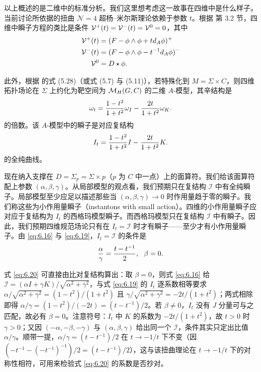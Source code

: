 以上概述的是二维中的标准分析。我们这里想考虑这一故事在四维中是什么样子。当前讨论所依据的扭曲 ${\mathcal N}=4$ 超杨–米尔斯理论依赖于参数 $t$。根据 \cite{ref8} 第 3.2 节，四维中瞬子方程的类比是条件 $\mathcal{V}^+(t)=\mathcal{V}^-(t)=\mathcal{V}^0=0$，其中
\setcounter{equation}{16}
\begin{equation}\label{eq:6.17}
  \begin{aligned}\mathcal{V}^+(t)&=(F-\phi\wedge\phi+td_A\phi)^+\\
                   \mathcal{V}^-(t)&=(F-\phi\wedge\phi-t^{-1}d_A\phi)^-\\
                    \mathcal{V}^0&=D\star \phi.\end{aligned}
\end{equation}

此外，根据 \cite{ref8} 的式 (5.28)（或式 (5.7) 与 (5.11)），若特殊化到 $M=\Sigma\times C$，则四维拓扑场论在 $\Sigma$ 上约化为靶空间为 ${{\mathcal{M}}_H}(G,C)$ 的二维 $A$-模型，其辛结构是
\setcounter{equation}{17}
\begin{equation}\label{eq:6.18}
  \omega_t={1-t^2\over
1+t^2}\omega_I-{2t\over 1+t^2}\omega_K.
\end{equation}
 的倍数。该 $A$-模型中的瞬子是对应复结构
\setcounter{equation}{18}
\begin{equation}\label{eq:6.19}
  I_t={1-t^2\over 1+t^2}I-{2t\over 1+t^2}K.
\end{equation}
 的全纯曲线。

现在纳入支撑在 $D=\Sigma_p=\Sigma\times p$（$p$ 为 $C$ 中一点）上的面算符。我们给该面算符配上参数 $(\alpha,\beta,\gamma)$。从局部模型的观点看，我们预期只在复结构 $\mathcal I$ 中有全纯瞬子。局部模型至少应足以描述那些当 $(\alpha,\beta,\gamma)\to 0$ 时作用量趋于零的瞬子。我们称这些为小作用量瞬子（instantons with small action）。四维的小作用量瞬子应对应于复结构为 $I_t$ 的西格玛模型瞬子。而西格玛模型只在复结构 $\mathcal I$ 中有瞬子。因此，我们预期四维规范场论只有在 $I_t=\mathcal I$ 时才有瞬子——至少才有小作用量瞬子。由 \eqref{eq:6.16} 与 \eqref{eq:6.19}，$I_t=\mathcal I$ 的条件是
\setcounter{equation}{19}
\begin{equation}\label{eq:6.20}
  {\alpha\over\gamma}={t-t^{-1}\over 2},~~\beta=0.
\end{equation}

\begin{yizhu}[含糊点拨]式 \eqref{eq:6.20} 可直接由比对复结构算出：取 $\beta=0$，则式 \eqref{eq:6.16} 给 $\mathcal I=(\alpha I+\gamma K)/\sqrt{\alpha^2+\gamma^2}$，与式 \eqref{eq:6.19} 的 $I_t$ 逐系数相等要求 $\alpha/\sqrt{\alpha^2+\gamma^2}=(1-t^2)/(1+t^2)$ 且 $\gamma/\sqrt{\alpha^2+\gamma^2}=-2t/(1+t^2)$；两式相除即得 $\alpha/\gamma=(1-t^2)/(-2t)=(t-t^{-1})/2$。若 $\beta\not=0$，$I_t$ 没有 $J$ 分量可与之匹配，故必有 $\beta=0$。注意符号：$I_t$ 中 $K$ 的系数为 $-2t/(1+t^2)$，故 $t>0$ 时 $\gamma>0$；又因 $(-\alpha,-\beta,-\gamma)$ 与 $(\alpha,\beta,\gamma)$ 给出同一个 $\mathcal I$，条件其实只定出比值 $\alpha/\gamma$。顺带一提，$\alpha/\gamma=(t-t^{-1})/2$ 在 $t\to-1/t$ 下不变（因 $(-t^{-1}-(-t^{-1})^{-1})/2=(t-t^{-1})/2$），这与该扭曲理论在 $t\to-1/t$ 下的对称性相符，可用来检验式 \eqref{eq:6.20} 的系数是否抄对。\end{yizhu}


